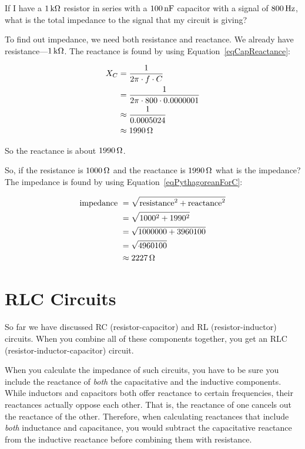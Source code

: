 \begin{exampleprob}
If I have a $1\,\si{\kilo\ohm}$ resistor in series with a $100\,\si{\nano\farad}$ capacitor with a signal of $800\,\si{\hertz}$, what is the total impedance to the signal that my circuit is giving?

To find out impedance, we need both resistance and reactance.
We already have resistance---$1\,\si{\kilo\ohm}$.
The reactance is found by using Equation~\ref{eqCapReactance}:

\begin{align*}
X_C &= \frac{1}{2\pi\cdot f\cdot C} \\
    &= \frac{1}{2\pi\cdot 800 \cdot 0.0000001} \\
    &\approx \frac{1}{0.0005024} \\
    &\approx 1990\,\si{\ohm}
\end{align*}

So the reactance is about $1990\,\si{\ohm}$.

So, if the resistance is $1000\,\si{\ohm}$ and the reactance is $1990\,\si{\ohm}$ what is the impedance?
The impedance is found by using Equation~\ref{eqPythagoreanForC}:

\begin{align*}
\textrm{impedance } &= \sqrt{\textrm{resistance}^2 + \textrm{reactance}^2} \\
 &= \sqrt{1000^2 + 1990^2} \\
 &= \sqrt{1000000 + 3960100} \\
 &= \sqrt{4960100} \\
 &\approx 2227\,\si{\ohm}
\end{align*}

\end{exampleprob}


\section{RLC Circuits}

So far we have discussed RC (resistor-capacitor) and RL (resistor-inductor) circuits.
When you combine all of these components together, you get an RLC (resistor-inductor-capacitor) circuit.

When you calculate the impedance of such circuits, you have to be sure you include the reactance of \emph{both} the capacitative and the inductive components.
While inductors and capacitors both offer reactance to certain frequencies, their reactances actually oppose each other.
That is, the reactance of one cancels out the reactance of the other.
Therefore, when calculating reactances that include \emph{both} inductance and capacitance, you would subtract the capacitative reactance from the inductive reactance before combining them with resistance.

